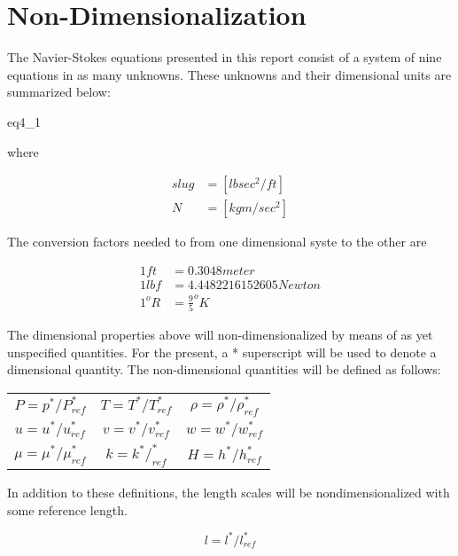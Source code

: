 \section{Non-Dimensionalization}

The Navier-Stokes equations presented in this report consist of a system of
nine equations in as many unknowns. These unknowns and their dimensional units
are summarized below:

{eq4_1}

where

\begin{equation}
\begin{aligned}
slug &= [lb sec^2/ft ] \\
N &= [kg m / sec^2 ]
\end{aligned}
\end{equation}

The conversion factors needed to from one dimensional syste to the other are

\begin{equation}
\begin{aligned}
1 ft &= 0.3048 meter \\
1 lbf &= 4.4482216152605 Newton \\
1 ^o R &= \frac{9}{5} ^oK
\end{aligned}
\end{equation}

The dimensional properties above will non-dimensionalized by means of as yet
unspecified quantities. For the present, a * superscript will be used to denote
a dimensional quantity. The non-dimensional quantities will be defined as
follows:

\begin{center}
\begin{tabular}{ c c c }
$P = p^*/P^*_{ref}$ & $T = T^*/T^*_{ref}$ & $\rho = \rho^*/\rho^*_{ref}$ \\
$u = u^*/u^*_{ref}$ & $v = v^*/v^*_{ref}$ & $w = w^*/w^*_{ref}$ \\
$\mu = \mu^*/\mu^*_{ref}$ & $k = k^*/^*_{ref}$ & $H = h^*/h^*_{ref}$
\end{tabular}
\end{center}

In addition to these definitions, the length scales will be nondimensionalized
with some reference length.

\begin{equation}
l = l^*/l^*_{ref}
\end{equation}

